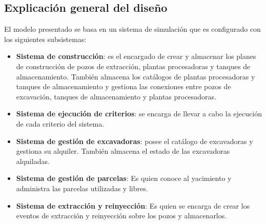 \subsection{Explicación general del diseño}
\par El modelo presentado se basa en un sistema de simulación que es configurado con los siguientes subsistemas:
\begin{itemize}
  \item \textbf{Sistema de construcción}: es el encargado de crear y almacenar los planes de construcción de pozos de extracción, plantas procesadoras y tanques de almacenamiento. También almacena los catálogos de plantas procesadoras y tanques de almacenamiento y gestiona las conexiones entre pozos de excavación, tanques de almacenamiento y plantas procesadoras.
  \item \textbf{Sistema de ejecución de criterios}: se encarga de llevar a cabo la ejecución de cada criterio del sistema.
  \item \textbf{Sistema de gestión de excavadoras}: posee el catálogo de excavadoras y gestiona su alquiler. También almacena el estado de las excavadoras alquiladas.
  \item \textbf{Sistema de gestión de parcelas}: Es quien conoce al yacimiento y administra las parcelas utilizadas y libres.
  \item \textbf{Sistema de extracción y reinyección}: Es quien se encarga de crear los eventos de extracción y reinyección sobre los pozos y almacenarlos.
\end{itemize}

